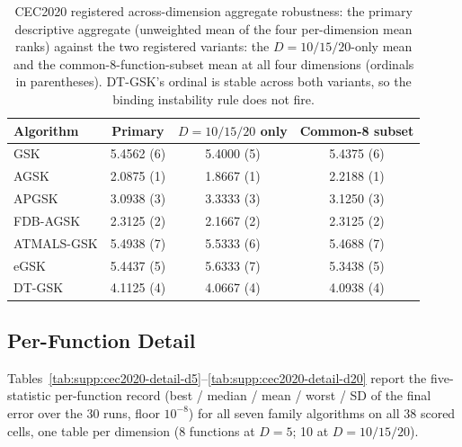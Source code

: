\documentclass[algorithms,article,submit,moreauthors,pdftex]{Definitions/mdpi}
\newcommand{\dtgsk}{DT-GSK}
\newcommand{\zebra}{}
\begin{document}
\begin{table}[H]
\caption{CEC2020 registered across-dimension aggregate robustness: the
primary descriptive aggregate (unweighted mean of the four per-dimension
mean ranks) against the two registered variants: the $D = 10/15/20$-only
mean and the common-8-function-subset mean at all four dimensions
(ordinals in parentheses).  \dtgsk{}'s ordinal is stable across both
variants, so the binding instability rule does not fire.
}\label{tab:supp:cec2020:robustness}
\centering
\tablesize{\footnotesize}
\zebra
\begin{tabular}{lccc}
\toprule
\textbf{Algorithm} & \textbf{Primary} & \textbf{$D=10/15/20$ only} &
\textbf{Common-8 subset} \\
\midrule
GSK & 5.4562 (6) & 5.4000 (5) & 5.4375 (6) \\
AGSK & 2.0875 (1) & 1.8667 (1) & 2.2188 (1) \\
APGSK & 3.0938 (3) & 3.3333 (3) & 3.1250 (3) \\
FDB-AGSK & 2.3125 (2) & 2.1667 (2) & 2.3125 (2) \\
ATMALS-GSK & 5.4938 (7) & 5.5333 (6) & 5.4688 (7) \\
eGSK & 5.4437 (5) & 5.6333 (7) & 5.3438 (5) \\
DT-GSK & 4.1125 (4) & 4.0667 (4) & 4.0938 (4) \\
\bottomrule
\end{tabular}
\end{table}

\subsection{Per-Function Detail}\label{sec:supp:cec2020:detail}

Tables~\ref{tab:supp:cec2020-detail-d5}--\ref{tab:supp:cec2020-detail-d20}
report the five-statistic per-function record (best / median / mean /
worst / SD of the final error over the 30 runs, floor $10^{-8}$) for all
seven family algorithms on all 38 scored cells, one table per dimension
(8 functions at $D = 5$; 10 at $D = 10/15/20$).
\end{document}
